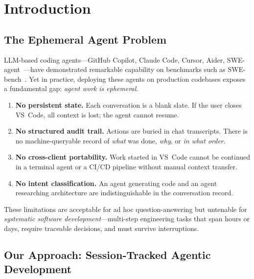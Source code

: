 \documentclass[11pt,letterpaper]{article}
\begin{document}
\section{Introduction}
\label{sec:intro}

\subsection{The Ephemeral Agent Problem}

LLM-based coding agents---GitHub Copilot, Claude Code, Cursor, Aider,
SWE-agent~\cite{yang2024swe}---have demonstrated remarkable capability on
benchmarks such as SWE-bench~\cite{jimenez2024swebench}.  Yet in practice,
deploying these agents on production codebases exposes a fundamental gap:
\emph{agent work is ephemeral}.

\begin{enumerate}[nosep]
    \item \textbf{No persistent state.}
          Each conversation is a blank slate.  If the user closes VS~Code,
          all context is lost; the agent cannot resume.
    \item \textbf{No structured audit trail.}
          Actions are buried in chat transcripts.  There is no
          machine-queryable record of \emph{what} was done, \emph{why},
          or \emph{in what order}.
    \item \textbf{No cross-client portability.}
          Work started in VS~Code cannot be continued in a terminal
          agent or a CI/CD pipeline without manual context transfer.
    \item \textbf{No intent classification.}
          An agent generating code and an agent researching architecture
          are indistinguishable in the conversation record.
\end{enumerate}

These limitations are acceptable for ad hoc question-answering but
untenable for \emph{systematic software development}---multi-step
engineering tasks that span hours or days, require traceable decisions,
and must survive interruptions.

\subsection{Our Approach: Session-Tracked Agentic Development}
\end{document}
